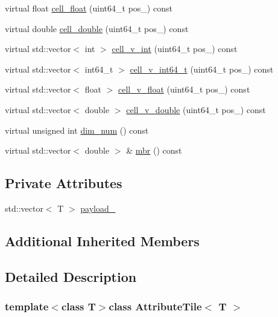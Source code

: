 \begin{DoxyCompactItemize}
\item 
virtual float \hyperlink{classAttributeTile_adfd423304a4a0b66976e32fc186d3d7b}{cell\+\_\+float} (uint64\+\_\+t pos\+\_\+) const 
\item 
virtual double \hyperlink{classAttributeTile_a131c4ab963db1e1e54fb723f38b96f40}{cell\+\_\+double} (uint64\+\_\+t pos\+\_\+) const 
\item 
virtual std\+::vector$<$ int $>$ \hyperlink{classAttributeTile_ad2fe04a74b4b89d57d94e7617f6de1f3}{cell\+\_\+v\+\_\+int} (uint64\+\_\+t pos\+\_\+) const 
\item 
virtual std\+::vector$<$ int64\+\_\+t $>$ \hyperlink{classAttributeTile_a19137fc5d96c7c0e909cdae58510ab57}{cell\+\_\+v\+\_\+int64\+\_\+t} (uint64\+\_\+t pos\+\_\+) const 
\item 
virtual std\+::vector$<$ float $>$ \hyperlink{classAttributeTile_a138fbef34ebd6ac21da27a283d41a67b}{cell\+\_\+v\+\_\+float} (uint64\+\_\+t pos\+\_\+) const 
\item 
virtual std\+::vector$<$ double $>$ \hyperlink{classAttributeTile_a7371aee0a0d75abc0623a10a646848f6}{cell\+\_\+v\+\_\+double} (uint64\+\_\+t pos\+\_\+) const 
\item 
virtual unsigned int \hyperlink{classAttributeTile_a1289416abc85465ff07c6454598d37ba}{dim\+\_\+num} () const 
\item 
virtual std\+::vector$<$ double $>$ \& \hyperlink{classAttributeTile_ad02895381110d7c6c00e0149a1d96def}{mbr} () const 
\end{DoxyCompactItemize}
\subsection*{Private Attributes}
\begin{DoxyCompactItemize}
\item 
std\+::vector$<$ T $>$ \hyperlink{classAttributeTile_a1fc1096adebca025565e774a89937736}{payload\+\_\+}
\end{DoxyCompactItemize}
\subsection*{Additional Inherited Members}


\subsection{Detailed Description}
\subsubsection*{template$<$class T$>$class Attribute\+Tile$<$ T $>$}

